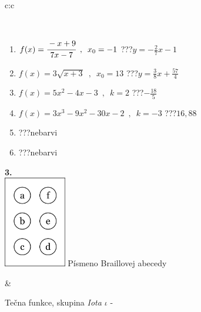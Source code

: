 \documentclass[10pt]{report}
\begin{document}
\begin{tabular}{c:c}
\begin{minipage}[c][104.5mm][t]{0.5\linewidth}
\begin{center}
\begin{minipage}{0.95\linewidth}
\begin{center}
\end{center}
\end{minipage}
\\[1mm]
\begin{minipage}{0.79\linewidth}
\begin{center}
\begin{varwidth}{\linewidth}
\begin{enumerate}
\small
\item $f(x)=\cfrac{-x+9}{7x-7}\enspace , \enspace x_0=-1$\quad \dotfill\; ???\;\dotfill \quad $y = -\frac{2}{7}x-1$
\item $f(x)=3\sqrt{x+3}\enspace , \enspace x_0=13$\quad \dotfill\; ???\;\dotfill \quad $y = \frac{3}{8}x+\frac{57}{4}$
\item $f(x)=5x^2-4x-3\enspace , \enspace k=2$\quad \dotfill\; ???\;\dotfill \quad $-\frac{18}{5}$
\item $f(x)=3x^3-9x^2-30x-2\enspace , \enspace k=-3$\quad \dotfill\; ???\;\dotfill \quad $16 , 88$
\item \quad \dotfill\; ???\;\dotfill \quad nebarvi
\item \quad \dotfill\; ???\;\dotfill \quad nebarvi
\end{enumerate}
\end{varwidth}
\end{center}
\end{minipage}
\begin{minipage}{0.20\linewidth}
\begin{center}
{\Huge\bfseries 3.} \\[2mm]
\includegraphics[height=40mm]{../images/braille.png}
{\small Písmeno Braillovej abecedy}
\end{center}
\end{minipage}
\end{center}
\end{minipage}
&
\begin{minipage}[c][104.5mm][t]{0.5\linewidth}
\begin{center}
\vspace{7mm}
{\huge Tečna funkce, skupina \textit{Iota $\iota$} -}\\[5mm]

\end{center}
\end{minipage}
\end{tabular}
\end{document}
